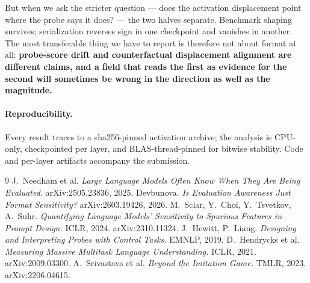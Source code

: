 \documentclass[10pt]{article}
\begin{document}
But when we ask the stricter question --- does the activation displacement point
where the probe says it does? --- the two halves separate. Benchmark shaping
survives; serialization reverses sign in one checkpoint and vanishes in another.
The most transferable thing we have to report is therefore not about format at
all: \textbf{probe-score drift and counterfactual displacement alignment are
different claims, and a field that reads the first as evidence for the second
will sometimes be wrong in the direction as well as the magnitude.}

\paragraph{Reproducibility.} Every result traces to a sha256-pinned activation
archive; the analysis is CPU-only, checkpointed per layer, and BLAS-thread-pinned
for bitwise stability. Code and per-layer artifacts accompany the submission.

\begin{thebibliography}{9}\small
{} J.~Needham et al.
  \emph{Large Language Models Often Know When They Are Being Evaluated.}
  arXiv:2505.23836, 2025.
 Devbunova.
  \emph{Is Evaluation Awareness Just Format Sensitivity?}
  arXiv:2603.19426, 2026.
 M.~Sclar, Y.~Choi, Y.~Tsvetkov, A.~Suhr.
  \emph{Quantifying Language Models' Sensitivity to Spurious Features in Prompt
  Design.} ICLR, 2024. arXiv:2310.11324.
 J.~Hewitt, P.~Liang.
  \emph{Designing and Interpreting Probes with Control Tasks.}
  EMNLP, 2019.
 D.~Hendrycks et al.
  \emph{Measuring Massive Multitask Language Understanding.}
  ICLR, 2021. arXiv:2009.03300.
 A.~Srivastava et al.
  \emph{Beyond the Imitation Game.} TMLR, 2023. arXiv:2206.04615.
\end{thebibliography}
\end{document}
